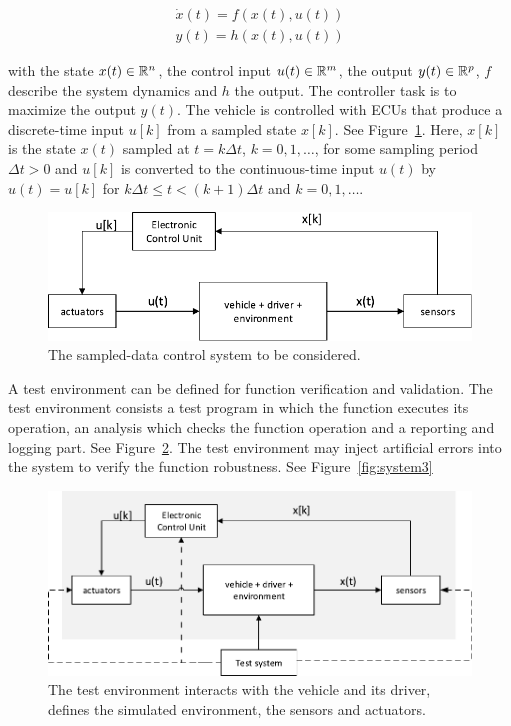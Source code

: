 \documentclass[a4paper, fleqn]{template/cas-dc}
\begin{document}
	\begin{equation}					
		\begin{aligned}
			\dot{x}(t) = f(x(t),u(t)) \\				
			y(t) = h(x(t),u(t))
		\end{aligned}	
	\end{equation}
	
	with the state $x(t)\in\mathbb R^n$, the control input $u(t)\in\mathbb R^m$, the output $y(t)\in\mathbb R^p$, $f$ describe the system dynamics and $h$ the output. The controller task is to maximize the output $y(t)$. The vehicle is controlled with ECUs that produce a discrete-time input $u[k]$ from a sampled state $x[k]$. See Figure~\ref{fig:system1}. Here, $x[k]$ is the state $x(t)$ sampled at $t = k\Delta t$, $k=0, 1, \ldots$, for some sampling period $\Delta t > 0$ and $u[k]$ is converted to the continuous-time input $u(t)$ by $u(t) = u[k]$ for $k \Delta t\leq t<(k+1)\Delta t$ and $k=0, 1, \ldots$.				
	
	\begin{figure}[h]
		\begin{center}
			\includegraphics[scale=0.5]{figures/system1_.pdf}
			\caption{The sampled-data control system to be considered.}
			\label{fig:system1}
		\end{center}
	\end{figure}
	
	A test environment can be defined for function verification and validation. The test environment consists a test program in which the function executes its operation, an analysis which checks the function operation and a reporting and logging part. See Figure~\ref{fig:system2}. The test environment may inject artificial errors into the system to verify the function robustness. See Figure~\ref{fig:system3}
	
	\begin{figure}[h]
		\begin{center}
			\includegraphics[scale=0.5]{figures/system2_.pdf}
			\caption{The test environment interacts with the vehicle and its driver, defines the simulated environment, the sensors and actuators.}
			\label{fig:system2}
		\end{center}
	\end{figure}
	
\end{document}
